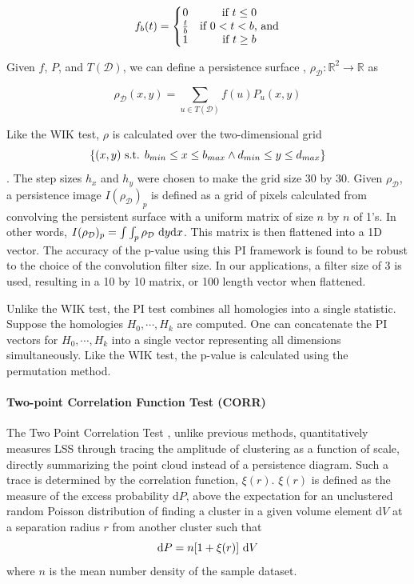 \documentclass[12pt]{article}
\begin{document}
\[ f_{b}(t) =  \left\{\begin{matrix}
0 & \textup{if } t \leq 0 \\
\frac{t}{b} & \textup{if } 0 < t < b\textup{, and}\\
1 & \textup{if } t \geq b
\end{matrix}\right. \]

Given $f$, $P$, and $T(\mathcal{D})$, we can define a persistence surface \citep{adams2015persistent}, $\rho_{\mathcal{D}} : \mathbb{R}^{2} \rightarrow \mathbb{R}$ as

\[ \rho_{\mathcal{D}}(x, y) = \sum_{u \in T(\mathcal{D})} f(u)P_{u}(x,y) \]

Like the WIK test, $\rho$ is calculated over the two-dimensional grid \[ \{ (x, y) \textup{ s.t. } b_{min} \leq x \leq b_{max} \wedge d_{min} \leq y \leq d_{max} \} \]. The step sizes $h_{x}$ and $h_{y}$ were chosen to make the grid size 30 by 30. Given $\rho_{\mathcal{D}}$, a persistence image \citep{adams2015persistent} $I(\rho_{\mathcal{D}})_{p}$ is defined as a grid of pixels calculated from convolving the persistent surface with a uniform matrix of size $n$ by $n$ of 1's. In other words, $I(\rho_{\mathcal{D}})_{p} = \int\int_{p} \rho_{\mathcal{D}} \textup{ d}y\textup{d}x$. This matrix is then flattened into a 1D vector.  The accuracy of the p-value using this PI framework is found to be robust to the choice of the convolution filter size. In our applications, a filter size of 3 is used, resulting in a 10 by 10 matrix, or 100 length vector when flattened.

Unlike the WIK test, the PI test combines all homologies into a single statistic. Suppose the homologies $H_{0}, \cdots, H_{k}$ are computed. One can concatenate the PI vectors for $H_{0}, \cdots, H_{k}$ into a single vector representing all dimensions simultaneously. Like the WIK test, the p-value is calculated using the permutation method.

\paragraph{Two-point Correlation Function Test (CORR)}
The Two Point Correlation Test \citep{landy1993bias}, unlike previous methods, quantitatively measures LSS through tracing the amplitude of clustering as a function of scale, directly summarizing the point cloud instead of a persistence diagram. Such a trace is determined by the correlation function, $\xi(r)$. $\xi(r)$ is defined as the measure of the excess probability d$P$, above the expectation for an unclustered random Poisson distribution of finding a cluster in a given volume element d$V$ at a separation radius $r$ from another cluster such that
\[ \textup{d}P = n[1 + \xi(r)] \textup{ d}V \] where $n$ is the mean number density of the sample dataset.
\end{document}
